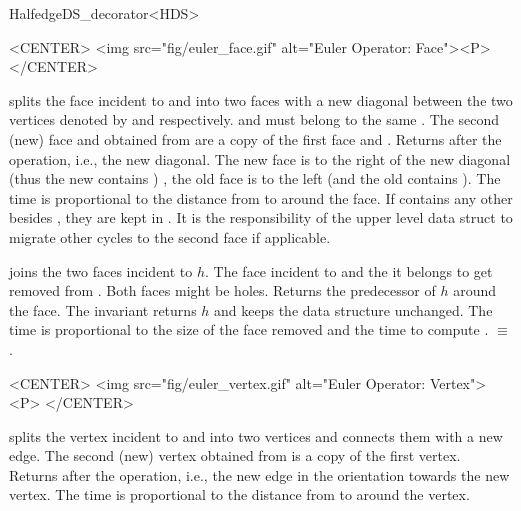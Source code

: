\begin{ccRefClass}{HalfedgeDS_decorator<HDS>}
\begin{ccHtmlOnly}
    <CENTER>
    <img src="fig/euler_face.gif" alt="Euler Operator: Face"><P>
    </CENTER>
\end{ccHtmlOnly}

    {splits the face incident to  and  into two faces
     with a new diagonal between the two vertices denoted by  and
      respectively.  and  must belong to the same .
     The second (new) face {\XHDS and }
     obtained from  are a copy of the first face {\XHDS and }.
     Returns  after the operation, i.e., the new diagonal.
     The new face is to the right of the new diagonal
     {\XHDS (thus the new  contains )}
     , the old face is to the left 
     {\XHDS (and the old  contains )}.
     The time is proportional 
     to the distance from  to  around the face.
     {\XHDS If  contains any other 
     besides ,
     they are kept in . It is the responsibility of the upper level 
     data struct to migrate other cycles to the second face if applicable.}
    } 

    {joins the two faces incident to $h$. The face incident to
      {\XHDS and the  it belongs to}
     get removed from .
    Both faces might be holes. Returns the predecessor of $h$ around the face. The invariant
     returns $h$ and keeps
    the data structure unchanged. The time is proportional to the size
    of the face removed and the time to compute .
      $\equiv$
    .
    }


\begin{ccHtmlOnly}
    <CENTER>
    <img src="fig/euler_vertex.gif" alt="Euler Operator: Vertex"><P>
    </CENTER>
\end{ccHtmlOnly}

    {splits the vertex incident to  and  into two vertices
     and connects them with a new edge. The second (new) vertex
     obtained from  is a copy of the first vertex. Returns
      after the operation, i.e., the new edge
     in the orientation towards the new vertex. The time is proportional 
     to the distance from  to  around the vertex.} 


\end{ccRefClass}
